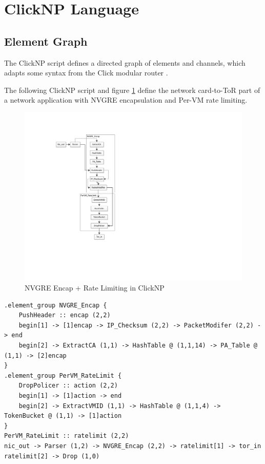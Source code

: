 \section{ClickNP Language}
\label{clicknp:sec:language}

\subsection{Element Graph}

The ClickNP script defines a directed graph of elements and channels, which adapts some syntax from the Click modular router \cite{kohler2000click}.

The following ClickNP script and figure \ref{clicknp:fig:ClickNPScriptExample} define the network card-to-ToR part of a network application with NVGRE encapsulation and Per-VM rate limiting.

\begin{figure}[!t]
	\centering
	\includegraphics[width=1.0\columnwidth]{image/ApplicationExample}
	\vspace{-0.25in}
	\caption{NVGRE Encap + Rate Limiting in ClickNP}
	\vspace{-0.15in}
	\label{clicknp:fig:ClickNPScriptExample}
\end{figure}

\begin{lstlisting}
.element_group NVGRE_Encap {
    PushHeader :: encap (2,2)
    begin[1] -> [1]encap -> IP_Checksum (2,2) -> PacketModifer (2,2) -> end
    begin[2] -> ExtractCA (1,1) -> HashTable @ (1,1,14) -> PA_Table @ (1,1) -> [2]encap
}
.element_group PerVM_RateLimit {
    DropPolicer :: action (2,2)
    begin[1] -> [1]action -> end
    begin[2] -> ExtractVMID (1,1) -> HashTable @ (1,1,4) -> TokenBucket @ (1,1) -> [1]action
}
PerVM_RateLimit :: ratelimit (2,2)
nic_out -> Parser (1,2) -> NVGRE_Encap (2,2) -> ratelimit[1] -> tor_in
ratelimit[2] -> Drop (1,0)
\end{lstlisting}


